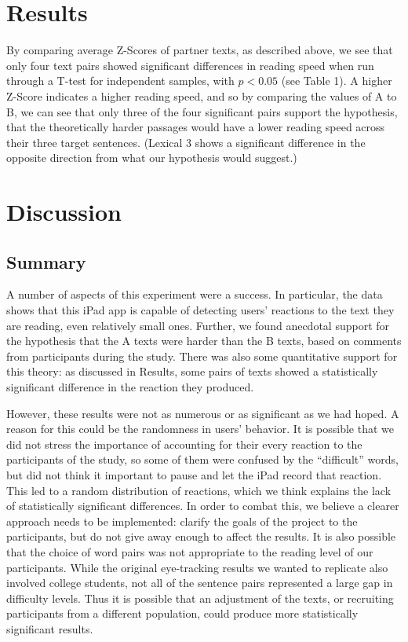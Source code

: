 \documentclass[11pt,letterpaper]{article}
\begin{document}
	
	\section{Results}
	
	By comparing average Z-Scores of partner texts, as described above, we see that only four text pairs showed significant differences in reading speed when run through a T-test for independent samples, with $p < 0.05$  (see Table 1). A higher Z-Score indicates a higher reading speed, and so by comparing the values of A to B, we can see that only three of the four significant pairs support the hypothesis, that the theoretically harder passages would have a lower reading speed across their three target sentences. (Lexical 3 shows a significant difference in the opposite direction from what our hypothesis would suggest.)
	
	\section{Discussion}
	
	\subsection{Summary}
	
	A number of aspects of this experiment were a success. In particular, the data shows that this iPad app is capable of detecting users' reactions to the text they are reading, even relatively small ones. Further, we found anecdotal support for the hypothesis that the A texts were harder than the B texts, based on comments from participants during the study. There was also some quantitative support for this theory: as discussed in Results, some pairs of texts showed a statistically significant difference in the reaction they produced. 
	
	However, these results were not as numerous or as significant as we had hoped. A reason for this could be the randomness in users' behavior. It is possible that we did not stress the importance of accounting for their every reaction to the participants of the study, so some of them were confused by the ``difficult'' words, but did not think it important to pause and let the iPad record that reaction. This led to a random distribution of reactions, which we think explains the lack of statistically significant differences. In order to combat this, we believe a clearer approach needs to be implemented: clarify the goals of the project to the participants, but do not give away enough to affect the results. It is also possible that the choice of word pairs was not appropriate to the reading level of our participants. While the original eye-tracking results we wanted to replicate also involved college students, not all of the sentence pairs represented a large gap in difficulty levels. Thus it is possible that an adjustment of the texts, or recruiting participants from a different population, could produce more statistically significant results.
	
\end{document}

